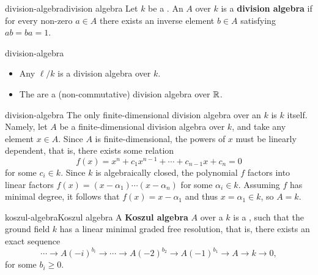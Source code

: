 \begin{topic}{division-algebra}{division algebra}
    Let $k$ be a . An  $A$ over $k$ is a \textbf{division algebra} if for every non-zero $a \in A$ there exists an inverse element $b \in A$ satisfying $ab = ba = 1$.
\end{topic}

\begin{example}{division-algebra}
    \begin{itemize}
        \item Any  $\ell / k$ is a division algebra over $k$.
        \item The  are a (non-commutative) division algebra over $\mathbb{R}$.
    \end{itemize}
\end{example}

\begin{example}{division-algebra}
    The only finite-dimensional division algebra over an  $k$ is $k$ itself. Namely, let $A$ be a finite-dimensional division algebra over $k$, and take any element $x \in A$. Since $A$ is finite-dimensional, the powers of $x$ must be linearly dependent, that is, there exists some relation
    \[ f(x) = x^n + c_1 x^{n - 1} + \cdots + c_{n - 1} x + c_n = 0 \]
    for some $c_i \in k$. Since $k$ is algebraically closed, the polynomial $f$ factors into linear factors $f(x) = (x - \alpha_1) \cdots (x - \alpha_n)$ for some $\alpha_i \in k$. Assuming $f$ has minimal degree, it follows that $f(x) = x - \alpha_1$ and thus $x = \alpha_1 \in k$, so $A = k$.
\end{example}

\begin{topic}{koszul-algebra}{Koszul algebra}
    A \textbf{Koszul algebra} $A$ over a  $k$ is a  , such that the ground field $k$ has a linear minimal graded free resolution, that is, there exists an exact sequence
    \[ \cdots \to A(-i)^{b_i} \to \cdots \to A(-2)^{b_2} \to A(-1)^{b_1} \to A \to k \to 0 , \]
    for some $b_i \ge 0$.
\end{topic}


